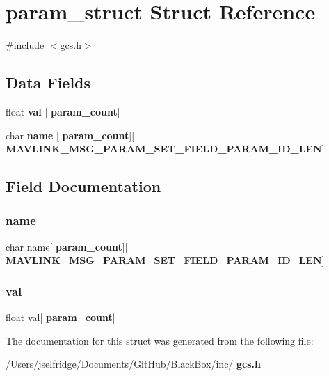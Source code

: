 \section{param\+\_\+struct Struct Reference}
\label{structparam__struct}


{\ttfamily \#include $<$gcs.\+h$>$}

\subsection*{Data Fields}
\begin{DoxyCompactItemize}
\item 
float \textbf{ val} [\textbf{ param\+\_\+count}]
\item 
char \textbf{ name} [\textbf{ param\+\_\+count}][\textbf{ M\+A\+V\+L\+I\+N\+K\+\_\+\+M\+S\+G\+\_\+\+P\+A\+R\+A\+M\+\_\+\+S\+E\+T\+\_\+\+F\+I\+E\+L\+D\+\_\+\+P\+A\+R\+A\+M\+\_\+\+I\+D\+\_\+\+L\+EN}]
\end{DoxyCompactItemize}


\subsection{Field Documentation}
\mbox{\label{structparam__struct_a87a9cfd8efdfb1122594a7c78fcbbb1b}} 
\subsubsection{name}
{\footnotesize\ttfamily char name[\textbf{ param\+\_\+count}][\textbf{ M\+A\+V\+L\+I\+N\+K\+\_\+\+M\+S\+G\+\_\+\+P\+A\+R\+A\+M\+\_\+\+S\+E\+T\+\_\+\+F\+I\+E\+L\+D\+\_\+\+P\+A\+R\+A\+M\+\_\+\+I\+D\+\_\+\+L\+EN}]}

\mbox{\label{structparam__struct_a8bd3cb57c7d43e01a33319c6c9230c1e}} 
\subsubsection{val}
{\footnotesize\ttfamily float val[\textbf{ param\+\_\+count}]}



The documentation for this struct was generated from the following file\+:\begin{DoxyCompactItemize}
\item 
/\+Users/jselfridge/\+Documents/\+Git\+Hub/\+Black\+Box/inc/\textbf{ gcs.\+h}\end{DoxyCompactItemize}
